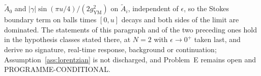 \(\tilde A_0\) and \(|\gamma|\sin(\pi u/4)/(2g_{\mathrm{YM}}^2)\) on \(\tilde A_i\), independent of \(\epsilon\), so the Stokes boundary term on balls times \([0,u]\) decays and both sides of the limit are dominated. The statements of this paragraph and of the two preceding ones hold in the hypothesis classes stated there, at \(N=2\) with \(\epsilon\to0^+\) taken last, and derive no signature, real-time response, background or continuation; Assumption~\ref{ass:lorentzian} is not discharged, and Problem~E remains open and PROGRAMME-CONDITIONAL.
